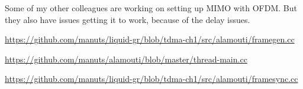 \documentclass{article}
\begin{document}
Some of my other colleagues are working on setting up MIMO with OFDM. But they
also have issues getting it to work, because of the delay issues.

\begin{thebibliography}{9}
  \url{https://github.com/manuts/liquid-gr/blob/tdma-ch1/src/alamouti/framegen.cc}

  \url{https://github.com/manuts/alamouti/blob/master/thread-main.cc}

  \url{https://github.com/manuts/liquid-gr/blob/tdma-ch1/src/alamouti/framesync.cc}

\end{thebibliography}
\end{document}
